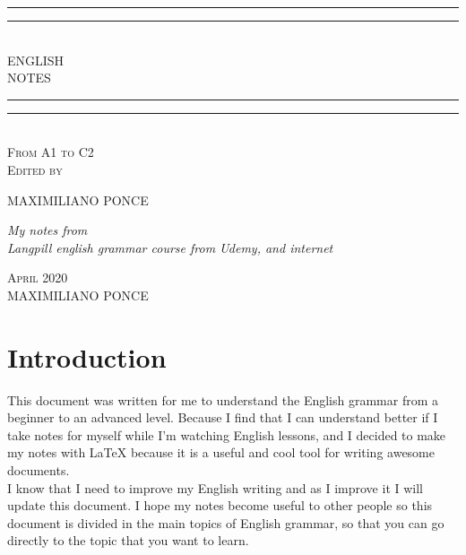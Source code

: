 \documentclass[hidelinks,10pt,a4paper]{article}
\newlength{\drop}
\begin{document}
\begin{titlepage}

\textheight
    \centering
    \vspace*{\baselineskip}
    \rule{\textwidth}{1.6pt}\vspace*{-\baselineskip}\vspace*{2pt}
    \rule{\textwidth}{0.6pt}\\[\baselineskip]
    {\LARGE ENGLISH\\[0.2\baselineskip] NOTES}\\[0.2\baselineskip]
    \rule{\textwidth}{0.4pt}\vspace*{-\baselineskip}\vspace{3.2pt}
    \rule{\textwidth}{1.6pt}\\[\baselineskip]
    \scshape
    From A1 to C2 \\
    \vspace*{2\baselineskip}
    Edited by \\[\baselineskip]
    {\Large MAXIMILIANO PONCE\par}
    {\itshape My notes from \\Langpill english grammar course from Udemy, and internet\\\par}
    \vfill
    {\scshape April 2020} \\
    {\large MAXIMILIANO PONCE}\par

\end{titlepage}

\tableofcontents
\newpage

\section{Introduction}
\indent
This document was written for me to understand the English grammar from a beginner to an advanced level. Because I find that I can understand better if I take notes for myself while I'm watching English lessons, and I decided to make my notes with \LaTeX \hspace{0.05cm} because it is a useful and cool tool for writing awesome documents.\\

\indent I know that I need to improve my English writing and as I improve it I will update this document. I hope my notes become useful to other people so this document is divided in the main topics of English grammar, so that you can go directly to the topic that you want to learn.\\
\end{document}
